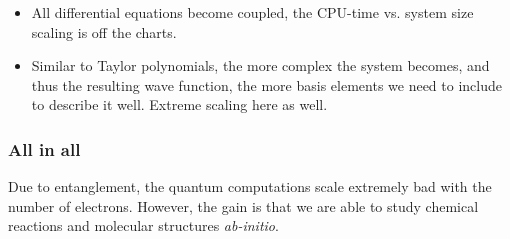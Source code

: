 \documentclass[
paper=128mm:96mm, %
fontsize=11pt, %
pagesize, %
parskip=half-, %
]{scrartcl} %
\theoremstyle{mythmstyle} %
\begin{document}
\begin{itemize}
\item All differential equations become coupled, the CPU-time vs. system size scaling is off the charts.
\item Similar to Taylor polynomials, the more complex the system becomes, and thus the resulting wave function, the more basis elements we need to include to describe it well. Extreme scaling here as well.
\end{itemize}

\clearpage


\subsubsection*{All in all}

Due to entanglement, the quantum computations scale extremely bad with the number of electrons. However, the gain is that we are able to study chemical reactions and molecular structures \textit{ab-initio}.

\clearpage

\end{document}
